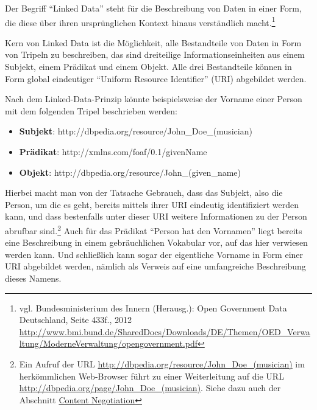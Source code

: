 \documentclass[,a4paper]{article}
\begin{document}

Der Begriff ``Linked Data'' steht für die Beschreibung von Daten in
einer Form, die diese über ihren ursprünglichen Kontext hinaus
verständlich macht.\footnote{vgl. Bundesministerium des Innern
  (Herausg.): Open Government Data Deutschland, Seite 433f., 2012
  \url{http://www.bmi.bund.de/SharedDocs/Downloads/DE/Themen/OED_Verwaltung/ModerneVerwaltung/opengovernment.pdf}}

Kern von Linked Data ist die Möglichkeit, alle Bestandteile von Daten in
Form von Tripeln zu beschreiben, das sind dreiteilige
Informationseinheiten aus einem Subjekt, einem Prädikat und einem
Objekt. Alle drei Bestandteile können in Form global eindeutiger
``Uniform Resource Identifier'' (URI) abgebildet werden.

Nach dem Linked-Data-Prinzip könnte beispielsweise der Vorname einer
Person mit dem folgenden Tripel beschrieben werden:

\begin{itemize}
\itemsep1pt\parskip0pt
\item
  \textbf{Subjekt}: http://dbpedia.org/resource/John\_Doe\_(musician)
\item
  \textbf{Prädikat}: http://xmlns.com/foaf/0.1/givenName
\item
  \textbf{Objekt}: http://dbpedia.org/resource/John\_(given\_name)
\end{itemize}

Hierbei macht man von der Tatsache Gebrauch, dass das Subjekt, also die
Person, um die es geht, bereits mittels ihrer URI eindeutig
identifiziert werden kann, und dass bestenfalls unter dieser URI weitere
Informationen zu der Person abrufbar sind.\footnote{Ein Aufruf der URL
  \url{http://dbpedia.org/resource/John_Doe_(musician)} im herkömmlichen
  Web-Browser führt zu einer Weiterleitung auf die URL
  \url{http://dbpedia.org/page/John_Doe_(musician)}. Siehe dazu auch der
  Abschnitt \hyperref[contentux5fnegotiation]{Content Negotiation}} Auch
für das Prädikat ``Person hat den Vornamen'' liegt bereits eine
Beschreibung in einem gebräuchlichen Vokabular vor, auf das hier
verwiesen werden kann. Und schließlich kann sogar der eigentliche
Vorname in Form einer URI abgebildet werden, nämlich als Verweis auf
eine umfangreiche Beschreibung dieses Namens.
\end{document}
